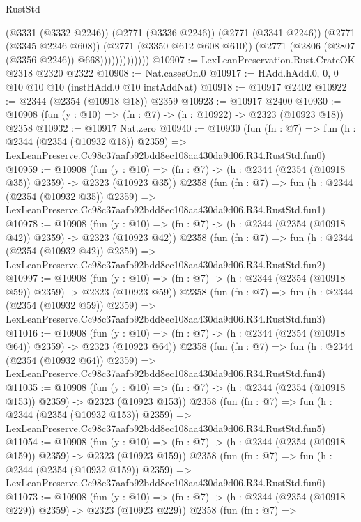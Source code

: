 \begin{lexlean}{RustStd}
\begin{coremodule}
                          (@3331 (@3332 @2246))
                          (@2771 (@3336 @2246))
                          (@2771 (@3341 @2246))
                          (@2771 (@3345 @2246 @608))
                          (@2771 (@3350 @612 @608 @610))
                          (@2771 (@2806 (@2807 (@3356 @2246)) @668)))))))))))))
@10907 := LexLeanPreservation.Rust.CrateOK @2318 @2320 @2322
@10908 := Nat.casesOn.{0}
@10917 := HAdd.hAdd.{0, 0, 0} @10 @10 @10 (instHAdd.{0} @10 instAddNat)
@10918 := @10917 @2402
@10922 := @2344 (@2354 (@10918 @18)) @2359
@10923 := @10917 @2400
@10930 := @10908 (fun (y : @10) => (fn : @7) -> (h : @10922) -> @2323 (@10923 @18)) @2358
@10932 := @10917 Nat.zero
@10940 := @10930
    (fun (fn : @7) =>
    fun (h : @2344 (@2354 (@10932 @18)) @2359) =>
    LexLeanPreserve.Cc98c37aafb92bdd8ec108aa430da9d06.R34.RustStd.fun0)
@10959 := @10908
    (fun (y : @10) => (fn : @7) -> (h : @2344 (@2354 (@10918 @35)) @2359) -> @2323 (@10923 @35))
    @2358
    (fun (fn : @7) =>
    fun (h : @2344 (@2354 (@10932 @35)) @2359) =>
    LexLeanPreserve.Cc98c37aafb92bdd8ec108aa430da9d06.R34.RustStd.fun1)
@10978 := @10908
    (fun (y : @10) => (fn : @7) -> (h : @2344 (@2354 (@10918 @42)) @2359) -> @2323 (@10923 @42))
    @2358
    (fun (fn : @7) =>
    fun (h : @2344 (@2354 (@10932 @42)) @2359) =>
    LexLeanPreserve.Cc98c37aafb92bdd8ec108aa430da9d06.R34.RustStd.fun2)
@10997 := @10908
    (fun (y : @10) => (fn : @7) -> (h : @2344 (@2354 (@10918 @59)) @2359) -> @2323 (@10923 @59))
    @2358
    (fun (fn : @7) =>
    fun (h : @2344 (@2354 (@10932 @59)) @2359) =>
    LexLeanPreserve.Cc98c37aafb92bdd8ec108aa430da9d06.R34.RustStd.fun3)
@11016 := @10908
    (fun (y : @10) => (fn : @7) -> (h : @2344 (@2354 (@10918 @64)) @2359) -> @2323 (@10923 @64))
    @2358
    (fun (fn : @7) =>
    fun (h : @2344 (@2354 (@10932 @64)) @2359) =>
    LexLeanPreserve.Cc98c37aafb92bdd8ec108aa430da9d06.R34.RustStd.fun4)
@11035 := @10908
    (fun (y : @10) => (fn : @7) -> (h : @2344 (@2354 (@10918 @153)) @2359) -> @2323 (@10923 @153))
    @2358
    (fun (fn : @7) =>
    fun (h : @2344 (@2354 (@10932 @153)) @2359) =>
    LexLeanPreserve.Cc98c37aafb92bdd8ec108aa430da9d06.R34.RustStd.fun5)
@11054 := @10908
    (fun (y : @10) => (fn : @7) -> (h : @2344 (@2354 (@10918 @159)) @2359) -> @2323 (@10923 @159))
    @2358
    (fun (fn : @7) =>
    fun (h : @2344 (@2354 (@10932 @159)) @2359) =>
    LexLeanPreserve.Cc98c37aafb92bdd8ec108aa430da9d06.R34.RustStd.fun6)
@11073 := @10908
    (fun (y : @10) => (fn : @7) -> (h : @2344 (@2354 (@10918 @229)) @2359) -> @2323 (@10923 @229))
    @2358
    (fun (fn : @7) =>

\end{coremodule}
\end{lexlean}
